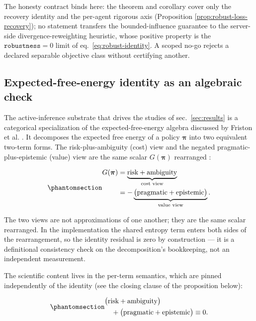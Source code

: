 \documentclass[
  english,
]{article}
\theoremstyle{plain}
\theoremstyle{definition}
\theoremstyle{remark}
\theoremstyle{definition}
\begin{document}
The honesty contract binds here: the theorem and corollary cover only
the recovery identity and the per-agent rigorous axis (Proposition
\ref{prop:robust-loss-recovery}); no statement transfers the
bounded-influence guarantee to the server-side divergence-reweighting
heuristic, whose positive property is the \(\texttt{robustness}=0\)
limit of eq.~\ref{eq:robust-identity}. A scoped no-go rejects a declared
separable objective class without certifying another.

\subsection{Expected-free-energy identity as an algebraic
check}\label{sec:formalism-efe}

The active-inference substrate that drives the studies of
sec.~\ref{sec:results} is a categorical specialization of the
expected-free-energy algebra discussed by Friston et al.
\citep{friston2024federated}. It decomposes the expected free energy of
a policy \(\boldsymbol{\pi}\) into two equivalent two-term forms. The
risk-plus-ambiguity (cost) view and the negated pragmatic-plus-epistemic
(value) view are the same scalar \(G(\boldsymbol{\pi})\) rearranged
\citep{dacosta2020active, friston2024federated}:

\begin{equation}\protect\phantomsection\label{eq:efe-decomposition}{\begin{aligned}
G(\boldsymbol{\pi})
&= \underbrace{\text{risk} + \text{ambiguity}}_{\text{cost view}}\\
&= -\underbrace{\big(\text{pragmatic} + \text{epistemic}\big)}_{\text{value view}}.
\end{aligned}}\end{equation}

The two views are not approximations of one another; they are the same
scalar rearranged. In the implementation the shared entropy term enters
both sides of the rearrangement, so the identity residual is zero by
construction --- it is a definitional consistency check on the
decomposition's bookkeeping, not an independent measurement.

The scientific content lives in the per-term semantics, which are pinned
independently of the identity (see the closing clause of the proposition
below):

\begin{equation}\protect\phantomsection\label{eq:efe-identity}{\begin{aligned}
&\big(\text{risk} + \text{ambiguity}\big)\\
&\quad + \big(\text{pragmatic} + \text{epistemic}\big)
\equiv 0.
\end{aligned}}\end{equation}
\end{document}
